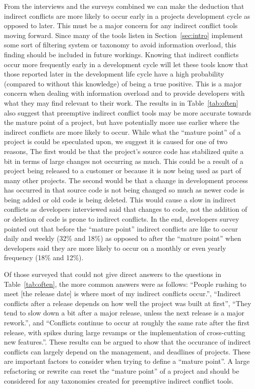 \documentclass[conference]{IEEEtran}
\begin{document}
From the interviews and the surveys combined we can make the deduction that indirect conflicts are more likely to occur early 
in a projects development cycle as opposed to later. This must be a major concern for any indirect conflict tools moving forward. Since many
of the tools listen in Section~\ref{sec:intro} implement some sort of filtering system or taxonomy to avoid information overload, this
finding should be included in future workings. Knowing that indirect conflicts occur more frequently early in a development cycle will let
these tools know that those reported later in the development life cycle have a high probability (compared to without this knowledge) of
being a true positive. This is a major concern when dealing with information overload and to provide developers with what they may find
relevant to their work. The results in in Table~\ref{tab:often} also suggest that preemptive indirect conflict tools may be more accurate
towards the mature point of a project, but have potentially more use earlier where the indirect conflicts are more likely to occur.
While what the ``mature point'' of a project is could be speculated upon, we suggest it is caused for one of two reasons, The
first would be that the project's source code has stabilized quite a bit in terms of large changes not occurring as much. This could be a result
of a project being released to a customer or because it is now being used as part of many other projects. The second would be that a change in
development process has occurred in that source code is not being changed so much as newer code is being added or old code is being deleted. This
would cause a slow in indirect conflicts as developers interviewed said that changes to code, not the addition of or deletion of code is prone
to indirect conflicts. In the end, developers survey pointed out that before the ``mature
point'' indirect conflicts are like to occur daily and weekly (32\% and 18\%) as opposed to after the ``mature point'' when developers
said they are more likely to occur on a monthly or even yearly frequency (18\% and 12\%).

Of those surveyed that could not give direct answers to the questions in Table~\ref{tab:often}, the more common answers were 
as follows: ``People rushing to meet [the release date] is where most of my indirect conflicts occur.'', ``Indirect conflicts
after a release depends on how well the project was built at first'', ``They tend to slow down a bit after a major release, 
unless the next release is a major rework.'', and ``Conflicts continue to occur at roughly the same rate after the first release,
with spikes during large revamps or the implementation of cross-cutting new features.''. These results can be argued to show that the occurance
of indirect conflicts can largely depend on the management, and deadlines of projects. These are important factors to consider when trying
to define a ``mature point''. A large refactoring or rewrite can reset the ``mature point'' of a project and should be considered for
any taxonomies created for preemptive indirect conflict tools.
\end{document}
